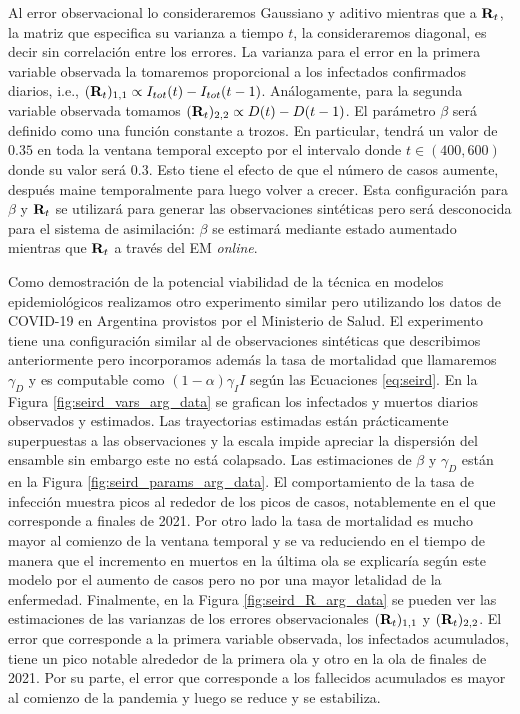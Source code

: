 Al error observacional lo consideraremos Gaussiano y aditivo mientras que a $\mathbf{R}_t$, la matriz que especifica su varianza a tiempo $t$, la consideraremos diagonal, es decir sin correlación entre los errores. La varianza para el error en la primera variable observada la tomaremos proporcional a los infectados confirmados diarios,  i.e., $(\mathbf{R}_t)_{1,1} \propto I_{tot}(t) - I_{tot}(t-1)$. Análogamente, para la segunda variable observada tomamos $(\mathbf{R}_t)_{2,2} \propto D(t) - D(t-1)$. El parámetro $\beta$ será definido como una función constante a trozos. En particular, tendrá un valor de $0.35$ en toda la ventana temporal excepto por el intervalo donde $t \in (400, 600)$ donde su valor será $0.3$. Esto tiene el efecto de que el número de casos aumente, después maine temporalmente para luego volver a crecer. Esta configuración para $\beta$ y $\mathbf{R}_t$ se utilizará para generar las observaciones sintéticas pero será desconocida para el sistema de asimilación: $\beta$ se estimará mediante estado aumentado mientras que $\mathbf{R}_t$ a través del EM \textit{online}.

Como demostración de la potencial viabilidad de la técnica en modelos epidemiológicos realizamos otro experimento similar pero utilizando los datos de COVID-19 en Argentina provistos por el Ministerio de Salud. El experimento tiene una configuración similar al de observaciones sintéticas que describimos anteriormente pero incorporamos además la tasa de mortalidad que llamaremos $\gamma_D$ y es computable como $(1-\alpha) \gamma_I I$ según las Ecuaciones \ref{eq:seird}. En la Figura \ref{fig:seird_vars_arg_data} se grafican los infectados y muertos diarios observados y estimados. Las trayectorias estimadas están prácticamente superpuestas a las observaciones y la escala impide apreciar la dispersión del ensamble sin embargo este no está colapsado. Las estimaciones de $\beta$ y $\gamma_D$ están en la Figura \ref{fig:seird_params_arg_data}. El comportamiento de la tasa de infección muestra picos al rededor de los picos de casos, notablemente en el que corresponde a finales de 2021. Por otro lado la tasa de mortalidad es mucho mayor al comienzo de la ventana temporal y se va reduciendo en el tiempo de manera que el incremento en muertos en la última ola se explicaría según este modelo por el aumento de casos pero no por una mayor letalidad de la enfermedad. Finalmente, en la Figura \ref{fig:seird_R_arg_data} se pueden ver las estimaciones de las varianzas de los errores observacionales $(\mathbf{R}_t)_{1,1}$ y $(\mathbf{R}_t)_{2, 2}$. El error que corresponde a la primera variable observada, los infectados acumulados, tiene un pico notable alrededor de la primera ola y otro en la ola de finales de 2021. Por su parte, el error que corresponde a los fallecidos acumulados es mayor al comienzo de la pandemia y luego se reduce y se estabiliza.


